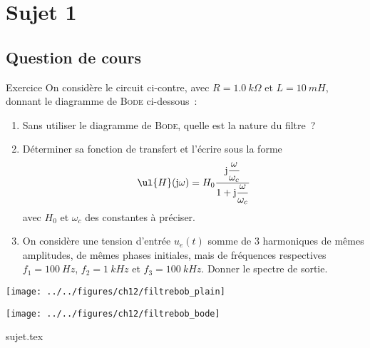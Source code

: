 \documentclass[a4paper, 11pt]{book}
\def\w{\omega}\def\O{\Omega} \def\Of{\vv{\O}}
\def\jj{\mathrm{j}}
\begin{document}
\chapter{Sujet 1}
\section{Question de cours}
\begin{NCexem}[]{Exercice}
    On considère le circuit ci-contre, avec $R = \SI{1.0}{k\Omega}$ et $L =
    \SI{10}{mH}$, donnant le diagramme de \textsc{Bode} ci-dessous~:

    \begin{minipage}{0.60\linewidth}
        \begin{enumerate}
            \item Sans utiliser le diagramme de \textsc{Bode}, quelle est la
                nature du filtre~?
            \item Déterminer sa fonction de transfert et l'écrire sous la forme
                \[\ul{H}(\jj\w) = H_0 \frac{\jj\dfrac{\w}{\w_c}}{1 +
                \jj\dfrac{\w}{\w_c}}\] avec $H_0$ et $\w_c$ des constantes à
                préciser.
            \item On considère une tension d'entrée $u_e(t)$ somme de 3
                harmoniques de mêmes amplitudes, de mêmes phases initiales, mais
                de fréquences respectives $f_1 = \SI{100}{Hz}$, $f_2 =
                \SI{1}{kHz}$ et $f_3 = \SI{100}{kHz}$. Donner le spectre de
                sortie.
        \end{enumerate}
    \end{minipage}
    \hfill
    \begin{minipage}{0.35\linewidth}
        \begin{center}
            \hspace{10pt}\texttt{[image: ../../figures/ch12/filtrebob\_plain]}
        \end{center}
        \begin{center}
            \texttt{[image: ../../figures/ch12/filtrebob\_bode]}
        \end{center}
    \end{minipage}
\end{NCexem}

\resetQ
{sujet.tex}

\resetQ
\newpage
\end{document}
